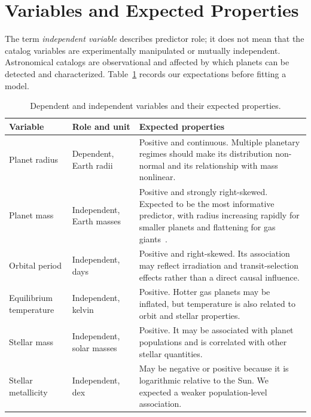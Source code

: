 \documentclass[11pt,a4paper]{article}
\begin{document}
\section{Variables and Expected Properties}

The term \emph{independent variable} describes predictor role; it does not mean that the catalog variables are experimentally manipulated or mutually independent. Astronomical catalogs are observational and affected by which planets can be detected and characterized. Table~\ref{tab:variables} records our expectations before fitting a model.

\begin{table}[H]
  \centering
  \small
  \begin{tabular}{>{\raggedright\arraybackslash}p{2.7cm}>{\raggedright\arraybackslash}p{2.4cm}>{\raggedright\arraybackslash}p{7.2cm}}
    \toprule
    Variable & Role and unit & Expected properties \\
    \midrule
    Planet radius & Dependent, Earth radii & Positive and continuous. Multiple planetary regimes should make its distribution non-normal and its relationship with mass nonlinear. \\
    Planet mass & Independent, Earth masses & Positive and strongly right-skewed. Expected to be the most informative predictor, with radius increasing rapidly for smaller planets and flattening for gas giants~\cite{chen2017massradius}. \\
    Orbital period & Independent, days & Positive and right-skewed. Its association may reflect irradiation and transit-selection effects rather than a direct causal influence. \\
    Equilibrium temperature & Independent, kelvin & Positive. Hotter gas planets may be inflated, but temperature is also related to orbit and stellar properties. \\
    Stellar mass & Independent, solar masses & Positive. It may be associated with planet populations and is correlated with other stellar quantities. \\
    Stellar metallicity & Independent, dex & May be negative or positive because it is logarithmic relative to the Sun. We expected a weaker population-level association. \\
    \bottomrule
  \end{tabular}
  \caption{Dependent and independent variables and their expected properties.}
  \label{tab:variables}
\end{table}
\end{document}
